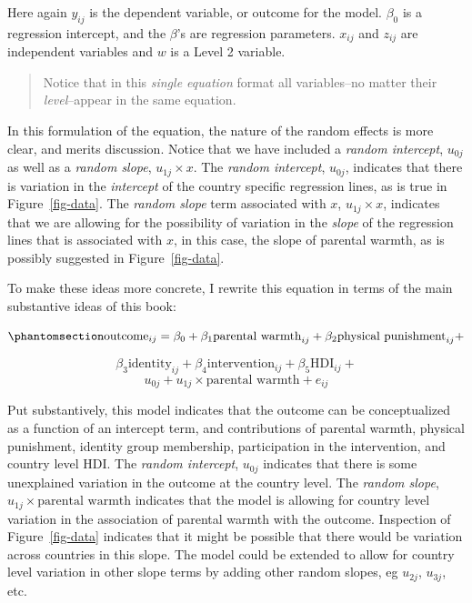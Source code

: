 \documentclass[
  letterpaper,
  DIV=11,
  numbers=noendperiod]{scrreprt}
\begin{document}
Here again \(y_{ij}\) is the dependent variable, or outcome for the
model. \(\beta_0\) is a regression intercept, and the \(\beta\)'s are
regression parameters. \(x_{ij}\) and \(z_{ij}\) are independent
variables and \(w\) is a Level 2 variable.

\begin{quote}
Notice that in this \emph{single equation} format all variables--no
matter their \emph{level}--appear in the same equation.
\end{quote}

In this formulation of the equation, the nature of the random effects is
more clear, and merits discussion. Notice that we have included a
\emph{random intercept}, \(u_{0j}\) as well as a \emph{random slope},
\(u_{1j} \times x\). The \emph{random intercept}, \(u_{0j}\), indicates
that there is variation in the \emph{intercept} of the country specific
regression lines, as is true in Figure~\ref{fig-data}. The \emph{random
slope} term associated with \(x\), \(u_{1j} \times x\), indicates that
we are allowing for the possibility of variation in the \emph{slope} of
the regression lines that is associated with \(x\), in this case, the
slope of parental warmth, as is possibly suggested in
Figure~\ref{fig-data}.

To make these ideas more concrete, I rewrite this equation in terms of
the main substantive ideas of this book:

\begin{equation}\phantomsection\label{eq-MLMsubstantive}{\text{outcome}_{ij} = \beta_0 + \beta_1 \text{parental warmth}_{ij} + \beta_2 \text{physical punishment}_{ij} +}\end{equation}

\[\beta_3 \text{identity}_{ij} + \beta_4 \text{intervention}_{ij} + \beta_5 \text{HDI}_{ij} + \]
\[u_{0j} + u_{1j} \times \text{parental warmth} + e_{ij}\]

Put substantively, this model indicates that the outcome can be
conceptualized as a function of an intercept term, and contributions of
parental warmth, physical punishment, identity group membership,
participation in the intervention, and country level HDI. The
\emph{random intercept}, \(u_{0j}\) indicates that there is some
unexplained variation in the outcome at the country level. The
\emph{random slope}, \(u_{1j} \times \text{parental warmth}\) indicates
that the model is allowing for country level variation in the
association of parental warmth with the outcome. Inspection of
Figure~\ref{fig-data} indicates that it might be possible that there
would be variation across countries in this slope. The model could be
extended to allow for country level variation in other slope terms by
adding other random slopes, eg \(u_{2j}\), \(u_{3j}\), etc.
\end{document}
